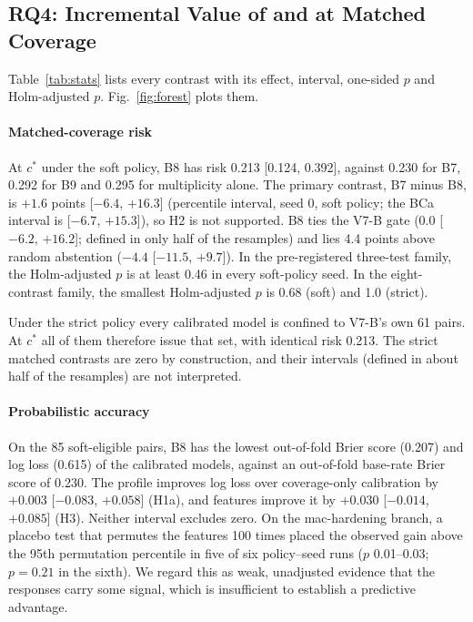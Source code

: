 \subsection{RQ4: Incremental Value of \cec{} and \ers{} at Matched Coverage}\label{sec:res-rq4}
Table~\ref{tab:stats} lists every contrast with its effect, interval, one-sided $p$ and Holm-adjusted $p$. Fig.~\ref{fig:forest} plots them.

\paragraph*{Matched-coverage risk} At $c^\ast$ under the soft policy, B8 has risk 0.213 [0.124, 0.392], against 0.230 for B7, 0.292 for B9 and 0.295 for multiplicity alone. The primary contrast, B7 minus B8, is $+1.6$ points [$-6.4$, $+16.3$] (percentile interval, seed 0, soft policy; the BCa interval is [$-6.7$, $+15.3$]), so H2 is not supported. B8 ties the V7-B gate (0.0 [$-6.2$, $+16.2$]; defined in only half of the resamples) and lies 4.4 points above random abstention ($-4.4$ [$-11.5$, $+9.7$]). In the pre-registered three-test family, the Holm-adjusted $p$ is at least 0.46 in every soft-policy seed. In the eight-contrast family, the smallest Holm-adjusted $p$ is 0.68 (soft) and 1.0 (strict).

Under the strict policy every calibrated model is confined to V7-B's own 61 \NDO{} pairs. At $c^\ast$ all of them therefore issue that set, with identical risk 0.213. The strict matched contrasts are zero by construction, and their intervals (defined in about half of the resamples) are not interpreted.

\paragraph*{Probabilistic accuracy} On the 85 soft-eligible pairs, B8 has the lowest out-of-fold Brier score (0.207) and log loss (0.615) of the calibrated models, against an out-of-fold base-rate Brier score of 0.230. The profile improves log loss over coverage-only calibration by $+0.003$ [$-0.083$, $+0.058$] (H1a), and \ers{} features improve it by $+0.030$ [$-0.014$, $+0.085$] (H3). Neither interval excludes zero. On the mac-hardening branch, a placebo test that permutes the \ers{} features 100 times placed the observed gain above the 95th permutation percentile in five of six policy--seed runs ($p$ 0.01--0.03; $p=0.21$ in the sixth). We regard this as weak, unadjusted evidence that the responses carry some signal, which is insufficient to establish a predictive advantage.

